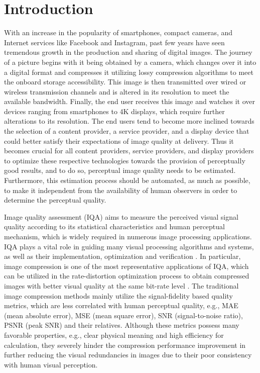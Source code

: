 \chapter{Introduction}

With an increase in the popularity of smartphones, compact cameras, and Internet services like Facebook and Instagram, past few years have seen tremendous growth in
the production and sharing of digital images. 
The journey of a picture begins with it being obtained by a camera, which changes over it into a digital format and compresses it utilizing lossy compression algorithms to meet the onboard storage accessibility. 
This image is then transmitted over wired or wireless transmission channels and is altered in its resolution to meet the available bandwidth. 
Finally, the end user receives this image and watches it over devices ranging from smartphones to 4K displays, which require further alterations to its resolution. 
The end users tend to become more inclined towards the selection of a content provider, a service provider, and a display device that could better satisfy their expectations of image quality at delivery. 
Thus it becomes crucial for all content providers, service providers, and display providers to optimize these respective technologies towards the provision of perceptually good results, and to do so, perceptual image quality needs to be estimated. 
Furthermore, this estimation process should be automated, as much as possible, to make it independent from the availability of human observers in order to determine the perceptual quality.

Image quality assessment (IQA) aims to measure the perceived visual signal quality according to its statistical characteristics and human perceptual mechanism, which is
widely required in numerous image processing applications. 
IQA plays a vital role in guiding many visual processing
algorithms and systems, as well as their implementation, optimization and verification \cite{Lin2011,Wang2018,Wang2018a,Zhang2016}. 
In particular, image
compression is one of the most representative applications of
IQA, which can be utilized in the rate-distortion optimization process to obtain compressed images with better visual
quality at the same bit-rate level \cite{Channappayya2008,Chen2010,Wang2012,Zhang2017,Zhang2017a,Ma2016}. 
The traditional
image compression methods mainly utilize the signal-fidelity
based quality metrics, which are less correlated with human
perceptual quality, e.g., MAE (mean absolute error), MSE
(mean square error), SNR (signal-to-noise ratio), PSNR (peak
SNR) and their relatives. 
Although these metrics possess many
favorable properties, e.g., clear physical meaning and high
efficiency for calculation, they severely hinder the compression performance improvement in further reducing the visual
redundancies in images due to their poor consistency with
human visual perception.

